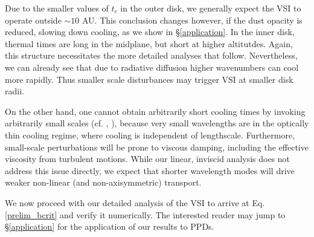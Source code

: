 \documentclass[iop, numberedappendix]{emulateapj}
\begin{document}
 Due to the smaller values of $t_c$ in the outer disk, we generally expect the VSI to 
 operate outside $\sim 10$ AU.  This conclusion changes however, if
 the dust opacity is reduced,  
slowing down cooling, as we show in \S\ref{application}. %
In the inner disk, thermal times are long in the midplane, but short at higher altitutdes. 
Again, this structure necessitates the more detailed analyses that follow.  Nevertheless, we can already 
see that due to radiative diffusion higher wavenumbers can cool more rapidly.  Thus smaller scale disturbances 
may trigger VSI at smaller disk radii. 

On the other hand, one cannot obtain arbitrarily short cooling times
by invoking arbitrarily small scales (cf. \citealt{urpin03}, 
), because very small wavelengths are in the
optically thin cooling regime,  where cooling is independent of
lengthscale. Furthermore, 
small-scale perturbations will be 
prone to viscous damping, including the effective viscosity from turbulent motions.
While our linear, inviscid analysis does not address this issue directly, we expect that 
shorter wavelength modes will drive weaker non-linear (and non-axisymmetric) transport. 


We now proceed with our detailed analysis of the VSI to arrive
at Eq. \ref{prelim_bcrit} and verify it numerically. The interested 
reader may jump to \S\ref{application} for the application of our
results to PPDs.     





 


\appendix




\end{document}
